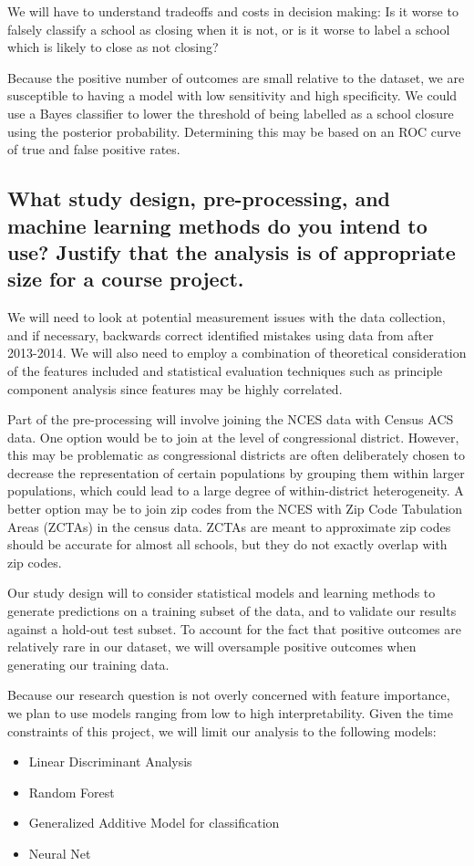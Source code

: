 \documentclass[twoside,11pt]{article}
\begin{document}
We will have to understand tradeoffs and costs in decision making:  Is it worse to falsely classify a school as closing when it is not, or is it worse to label a school which is likely to close as not closing?

Because the positive number of outcomes are small relative to the dataset, we are susceptible to having a model with low sensitivity and high specificity.  We could use a Bayes classifier to lower the threshold of being labelled as a school closure using the posterior probability.  Determining this may be based on an ROC curve of true and false positive rates.  


\subsection{What study design, pre-processing, and machine learning methods do you intend to use? Justify that the analysis is of appropriate size for a course project.}

We will need to look at potential measurement issues with the data collection, and if necessary, backwards correct identified mistakes using data from after 2013-2014. We will also need to employ a combination of theoretical consideration of the features included and statistical evaluation techniques such as principle component analysis since features may be highly correlated.

Part of the pre-processing will involve joining the NCES data with Census ACS data. One option would be to join at the level of congressional district. However, this may be problematic as congressional districts are often deliberately chosen to decrease the representation of certain populations by grouping them within larger populations, which could lead to a large degree of within-district heterogeneity. A better option may be to join zip codes from the NCES with Zip Code Tabulation Areas (ZCTAs) in the census data. ZCTAs are meant to approximate zip codes should be accurate for almost all schools, but they do not exactly overlap with zip codes. 

Our study design will to consider statistical models and learning methods to generate predictions on a training subset of the data, and to validate our results against a hold-out test subset. To account for the fact that positive outcomes are relatively rare in our dataset, we will oversample positive outcomes when generating our training data.

Because our research question is not overly concerned with feature importance, we plan to use models ranging from low to high interpretability. Given the time constraints of this project, we will limit our analysis to the following models:
\begin{itemize}
    \item Linear Discriminant Analysis
    \item Random Forest
    \item Generalized Additive Model for classification
    \item Neural Net
\end{itemize}
\end{document}
